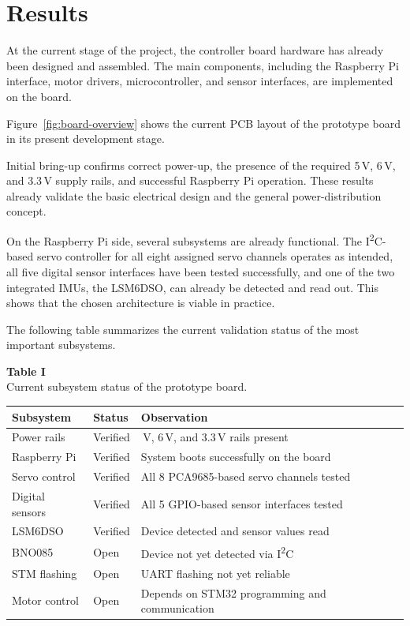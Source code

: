 \documentclass[conference]{IEEEtran}
\begin{document}
	\section{Results}
		
	At the current stage of the project, the controller board hardware has already been designed and assembled. The main components, including the Raspberry Pi interface, motor drivers, microcontroller, and sensor interfaces, are implemented on the board.
		
	Figure~\ref{fig:board-overview} shows the current PCB layout of the prototype board in its present development stage.
		
	Initial bring-up confirms correct power-up, the presence of the required 5\,V, 6\,V, and 3.3\,V supply rails, and successful Raspberry Pi operation. These results already validate the basic electrical design and the general power-distribution concept.
	
	On the Raspberry Pi side, several subsystems are already functional. The I\textsuperscript{2}C-based servo controller for all eight assigned servo channels operates as intended, all five digital sensor interfaces have been tested successfully, and one of the two integrated IMUs, the LSM6DSO, can already be detected and read out. This shows that the chosen architecture is viable in practice.
	
	The following table summarizes the current validation status of the most important subsystems.
	
	
	\begin{center}
		\textbf{Table I}\\
		Current subsystem status of the prototype board.
		
		\centering
		\begin{tabular}{|>{\raggedright\arraybackslash}p{2.4cm}|>{\raggedright\arraybackslash}p{1.8cm}|>{\raggedright\arraybackslash}p{2.4cm}|}
			\hline
			Subsystem & Status & Observation \\ \hline
			Power rails & Verified & 5\,V, 6\,V, and 3.3\,V rails present \\ \hline
			Raspberry Pi & Verified & System boots successfully on the board \\ \hline
			Servo control & Verified & All 8 PCA9685-based servo channels tested \\ \hline
			Digital sensors & Verified & All 5 GPIO-based sensor interfaces tested \\ \hline
			LSM6DSO & Verified & Device detected and sensor values read \\ \hline
			BNO085 & Open & Device not yet detected via I\textsuperscript{2}C \\ \hline
			STM flashing & Open & UART flashing not yet reliable \\ \hline
			Motor control & Open & Depends on STM32 programming and communication \\ \hline
		\end{tabular}
	\end{center}
		
\end{document}
